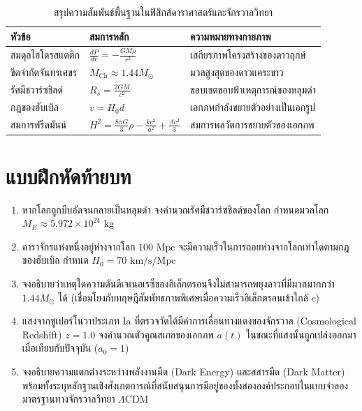 \begin{table}[H]
\centering
\small
\begin{tabularx}{\textwidth}{l >{\centering\arraybackslash}p{4.2cm} Y}
\toprule
\textbf{หัวข้อ} & \textbf{สมการหลัก} & \textbf{ความหมายทางกายภาพ} \\
\midrule
สมดุลไฮโดรสแตติก & $\frac{dP}{dr} = -\frac{GM\rho}{r^2}$ & เสถียรภาพโครงสร้างของดาวฤกษ์ \\
ขีดจำกัดจันทรเศขร & $M_{\text{Ch}} \approx 1.44 M_\odot$ & มวลสูงสุดของดาวแคระขาว \\
รัศมีชวาร์ซชิลด์ & $R_s = \frac{2GM}{c^2}$ & ขอบเขตขอบฟ้าเหตุการณ์ของหลุมดำ \\
กฎของฮับเบิล & $v = H_0 d$ & เอกภพกำลังขยายตัวอย่างเป็นเอกรูป \\
สมการฟรีดมันน์ & $H^2 = \frac{8\pi G}{3}\rho - \frac{kc^2}{a^2} + \frac{\Lambda c^2}{3}$ & สมการพลวัตการขยายตัวของเอกภพ \\
\bottomrule
\end{tabularx}
\caption{สรุปความสัมพันธ์พื้นฐานในฟิสิกส์ดาราศาสตร์และจักรวาลวิทยา}
\label{tab:astrophysics_summary}
\end{table}

\section{แบบฝึกหัดท้ายบท}
\begin{enumerate}
    \item หากโลกถูกบีบอัดจนกลายเป็นหลุมดำ จงคำนวณรัศมีชวาร์ซชิลด์ของโลก กำหนดมวลโลก $M_E \approx 5.972 \times 10^{24}\text{ kg}$
    \item ดาราจักรแห่งหนึ่งอยู่ห่างจากโลก $100\text{ Mpc}$ จะมีความเร็วในการถอยห่างจากโลกเท่าใดตามกฎของฮับเบิล กำหนด $H_0 = 70\text{ km/s/Mpc}$
    \item จงอธิบายว่าเหตุใดความดันดีเจเนอเรซีของอิเล็กตรอนจึงไม่สามารถพยุงดาวที่มีมวลมากกว่า $1.44 M_\odot$ ได้ (เชื่อมโยงกับทฤษฎีสัมพัทธภาพพิเศษเมื่อความเร็วอิเล็กตรอนเข้าใกล้ $c$)
    \item แสงจากซูเปอร์โนวาประเภท Ia ที่ตรวจวัดได้มีค่าการเลื่อนทางแดงของจักรวาล (Cosmological Redshift) $z = 1.0$ จงคำนวณตัวคูณสเกลของเอกภพ $a(t)$ ในขณะที่แสงนั้นถูกเปล่งออกมาเมื่อเทียบกับปัจจุบัน ($a_0 = 1$)
    \item จงอธิบายความแตกต่างระหว่างพลังงานมืด (Dark Energy) และสสารมืด (Dark Matter) พร้อมทั้งระบุหลักฐานเชิงสังเกตการณ์ที่สนับสนุนการมีอยู่ของทั้งสององค์ประกอบในแบบจำลองมาตรฐานทางจักรวาลวิทยา $\Lambda\text{CDM}$
\end{enumerate}
